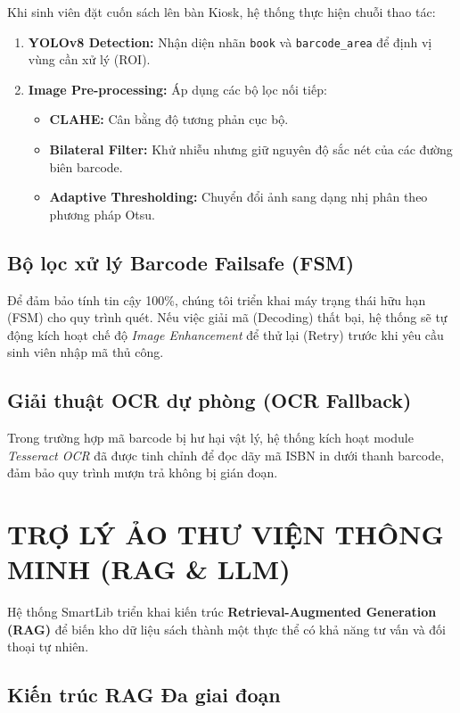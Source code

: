\documentclass[12pt,a4paper]{article}
\begin{document}
Khi sinh viên đặt cuốn sách lên bàn Kiosk, hệ thống thực hiện chuỗi thao tác:
\begin{enumerate}
    \item \textbf{YOLOv8 Detection:} Nhận diện nhãn \texttt{book} và \texttt{barcode\_area} để định vị vùng cần xử lý (ROI).
    \item \textbf{Image Pre-processing:} Áp dụng các bộ lọc nối tiếp:
    \begin{itemize}
        \item \textbf{CLAHE:} Cân bằng độ tương phản cục bộ.
        \item \textbf{Bilateral Filter:} Khử nhiễu nhưng giữ nguyên độ sắc nét của các đường biên barcode.
        \item \textbf{Adaptive Thresholding:} Chuyển đổi ảnh sang dạng nhị phân theo phương pháp Otsu.
    \end{itemize}
\end{enumerate}

\subsection{Bộ lọc xử lý Barcode Failsafe (FSM)}

Để đảm bảo tính tin cậy 100\%, chúng tôi triển khai máy trạng thái hữu hạn (FSM) cho quy trình quét. Nếu việc giải mã (Decoding) thất bại, hệ thống sẽ tự động kích hoạt chế độ \textit{Image Enhancement} để thử lại (Retry) trước khi yêu cầu sinh viên nhập mã thủ công.

\subsection{Giải thuật OCR dự phòng (OCR Fallback)}
Trong trường hợp mã barcode bị hư hại vật lý, hệ thống kích hoạt module \textit{Tesseract OCR} đã được tinh chỉnh để đọc dãy mã ISBN in dưới thanh barcode, đảm bảo quy trình mượn trả không bị gián đoạn.

\section{TRỢ LÝ ẢO THƯ VIỆN THÔNG MINH (RAG \& LLM)}

Hệ thống SmartLib triển khai kiến trúc \textbf{Retrieval-Augmented Generation (RAG)} để biến kho dữ liệu sách thành một thực thể có khả năng tư vấn và đối thoại tự nhiên.

\subsection{Kiến trúc RAG Đa giai đoạn}
\end{document}
